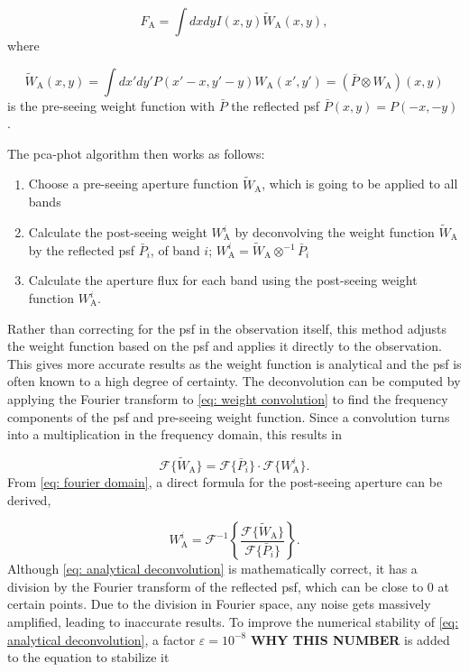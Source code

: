 \begin{equation}
    F_\mathrm{A} = \int dxdyI(x,y)\tilde{W}_\mathrm{A}(x,y),
\end{equation}
where 

\begin{equation}\label{eq: weight convolution}
    \tilde{W}_\mathrm{A}(x,y) = \int dx'dy'P(x'-x, y'-y)W_\mathrm{A}(x',y')=(\bar{P}\otimes W_\mathrm{A})(x,y)
\end{equation}
is the pre-seeing weight function with $\bar{P}$ the reflected \gls{psf} $\bar{P}(x,y)=P(-x,-y)$.

\noindent The \gls{pca-phot} algorithm then works as follows:
\begin{enumerate}
    \item Choose a pre-seeing aperture function $\tilde{W}_\mathrm{A}$, which is going to be applied to all bands
    \item Calculate the post-seeing weight $W_\mathrm{A}^i$ by deconvolving the weight function $\tilde{W}_\mathrm{A}$ by the reflected \gls{psf} $\bar{P}_i$, of band $i$; $W^i_\mathrm{A}=\tilde{W}_\mathrm{A}\otimes^{-1}\bar{P}_i$
    \item Calculate the aperture flux for each band using the post-seeing weight function $W_\mathrm{A}^i$.
\end{enumerate}
Rather than correcting for the \gls{psf} in the observation itself, this method adjusts the weight function based on the \gls{psf} and applies it directly to the observation. This gives more accurate results as the weight function is analytical and the \gls{psf} is often known to a high degree of certainty.
The deconvolution can be computed by applying the Fourier transform to \autoref{eq: weight convolution} to find the frequency components of the \gls{psf} and pre-seeing weight function. Since a convolution turns into a multiplication in the frequency domain, this results in

\begin{equation}\label{eq: fourier domain}
    \mathcal{F}\{\tilde{W}_\mathrm{A}\}=\mathcal{F}\{\bar{P}_i\}\cdot\mathcal{F}\{W_\mathrm{A}^i\}.
\end{equation}
From \autoref{eq: fourier domain}, a direct formula for the post-seeing aperture can be derived,

\begin{equation}\label{eq: analytical deconvolution}
    W^i_\mathrm{A} = \mathcal{F}^{-1}\left\{\frac{\mathcal{F}\{\tilde{W}_\mathrm{A}\}}{\mathcal{F}\{\bar{P}_i\}}\right\}.
\end{equation}
Although \autoref{eq: analytical deconvolution} is mathematically correct, it has a division by the Fourier transform of the reflected \gls{psf}, which can be close to 0 at certain points. Due to the division in Fourier space, any noise gets massively amplified, leading to inaccurate results. 
To improve the numerical stability of \autoref{eq: analytical deconvolution}, a factor $\varepsilon=10^{-8}$ \textbf{WHY THIS NUMBER} is added to the equation to stabilize it 


